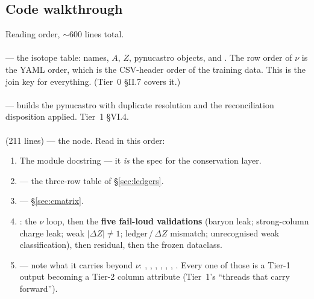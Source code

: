 \subsection{Code walkthrough}
\label{sec:codes7}

Reading order, ${\sim}600$ lines total.

\paragraph{} --- the isotope table: names, $A$, $Z$,
pynucastro  objects, and . The row order of $\nu$ is
the YAML order, which is the CSV-header order of the training data. This is the
join key for everything. (Tier~0 \S II.7 covers it.)

\paragraph{} --- builds the pynucastro
 with duplicate resolution and the reconciliation
disposition applied. Tier~1 \S VI.4.

\paragraph{} (211 lines) --- the node. Read in this order:
\begin{enumerate}
\item The module docstring --- it \emph{is} the spec for the conservation layer.
\item {} --- the three-row table of \S\ref{sec:ledgers}.
\item {} --- \S\ref{sec:cmatrix}.
\item {}: the $\nu$ loop, then the \textbf{five fail-loud
  validations} (baryon leak; strong-column charge leak; weak $|\Delta Z| \ne 1$;
  ledger\,/\,$\Delta Z$ mismatch; unrecognised weak classification), then
   residual, then the frozen dataclass.
\item {} --- note what it carries beyond $\nu$: ,
  , , , ,
  , . Every one of those is a Tier-1 output
  becoming a Tier-2 column attribute (Tier~1's ``threads that carry forward'').
\end{enumerate}


